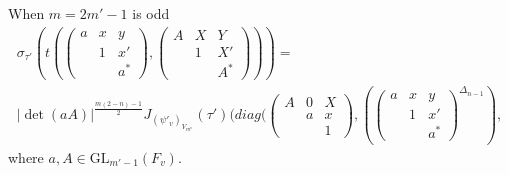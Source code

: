 \documentclass[12pts]{amsart}
\newcommand{\GL}{{\mathrm{GL}}}
\begin{document}
When $m=2m'-1$ is odd
\begin{multline}\label{12.55}
\sigma_{\tau'}(t(\begin{pmatrix}a&x&y\\&1&x'\\&&a^*\end{pmatrix}, \begin{pmatrix}A&X&Y\\&1&X'\\&&A^*\end{pmatrix}))=\\
|\det(aA)|^{\frac{m(2-n)-1}{2}} J_{(\psi'_v)_{V_{m^n}}}(\tau')(diag( \begin{pmatrix}A&0&X\\&a&x\\&&1\end{pmatrix}, (\begin{pmatrix}a&x&y\\&1&x'\\&&a^*\end{pmatrix}^{\Delta_{n-1}}),
\end{multline}
where $a, A\in \GL_{m'-1}(F_v)$.
\end{document}
